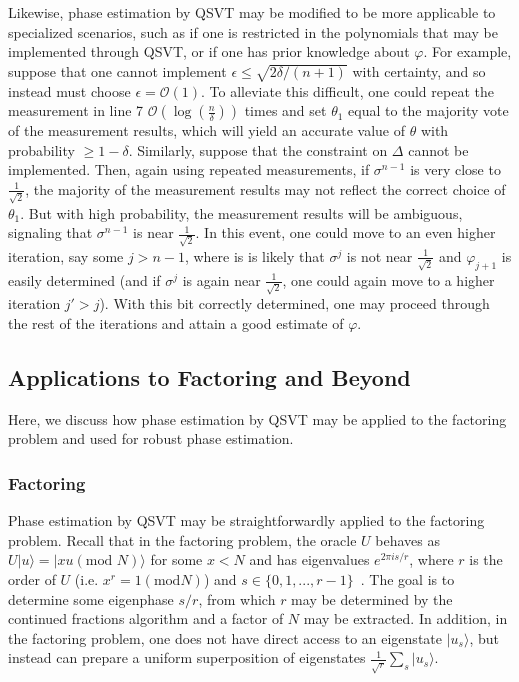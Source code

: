 \documentclass[aps,pra,showpacs,notitlepage,twocolumn,superscriptaddress,nofootinbib]{revtex4-1}
\begin{document}
        
    Likewise, phase estimation by QSVT may be modified to be more applicable to specialized scenarios, such as if one is restricted in the polynomials that may be implemented through QSVT, or if one has prior knowledge about $\varphi$. For example, suppose that one cannot implement $\epsilon \leq \sqrt{2 \delta/(n+1)}$ with certainty, and so instead must choose $\epsilon = \mathcal{O}(1)$. To alleviate this difficult, one could repeat the measurement in line 7 $\mathcal{O}(\log( \frac{n}{\delta}))$ times and set $\theta_1$ equal to the majority vote of the measurement results, which will yield an accurate value of $\theta$ with probability $\geq 1-\delta$. Similarly, suppose that the constraint on $\Delta$ cannot be implemented. Then, again using repeated measurements, if $\sigma^{n-1}$ is very close to $\frac{1}{\sqrt{2}}$, the majority of the measurement results may not reflect the correct choice of $\theta_1$. But with high probability, the measurement results will be ambiguous, signaling that $\sigma^{n-1}$ is near $\frac{1}{\sqrt{2}}$. In this event, one could move to an even higher iteration, say some $j>n-1$, where is is likely that $\sigma^j$ is not near $\frac{1}{\sqrt{2}}$ and $\varphi_{j+1}$ is easily determined (and if $\sigma^j$ is again near $\frac{1}{\sqrt{2}}$, one could again move to a higher iteration $j' > j$). With this bit correctly determined, one may proceed through the rest of the iterations and attain a good estimate of $\varphi$. 
        
    
    
    
    \subsection{Applications to Factoring and Beyond}
    Here, we discuss how phase estimation by QSVT may be applied to the factoring problem and used for robust phase estimation. 
        
    \subsubsection{Factoring}
    Phase estimation by QSVT may be straightforwardly applied to the factoring problem. Recall that in the factoring problem, the oracle $U$ behaves as $U|u\rangle = |xu (\text{mod } N)\rangle$ for some $x<N$ and has eigenvalues $e^{2\pi i s/r}$, where $r$ is the order of $U$ (i.e. $x^r = 1 (\text{mod} N)$) and $s \in \{ 0,1, ..., r-1\}$~\cite{nielsen2010quantum}. The goal is to determine some eigenphase $s/r$, from which $r$ may be determined by the continued fractions algorithm and a factor of $N$ may be extracted. In addition, in the factoring problem, one does not have direct access to an eigenstate $|u_s\rangle$, but instead can prepare a uniform superposition of eigenstates $\frac{1}{\sqrt{r}} \sum_s |u_s\rangle$.
    
\end{document}
